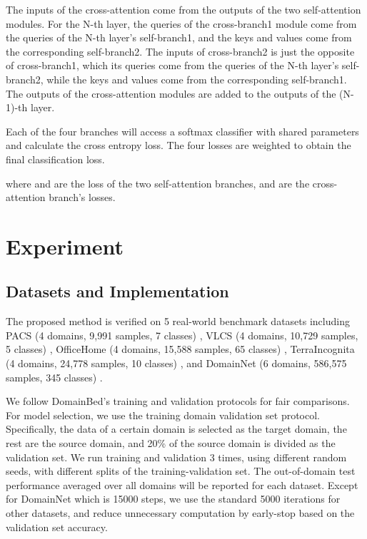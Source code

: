 \documentclass{article}
\begin{document}
The inputs of the cross-attention come from the outputs of the two self-attention modules. For the N-th layer, the queries of the cross-branch1 module come from the queries of the N-th layer's self-branch1, and the keys and values come from the corresponding self-branch2. The inputs of cross-branch2 is just the opposite of cross-branch1, which its queries come from the queries of the N-th layer's self-branch2, while the  keys and values come from the corresponding self-branch1. The outputs of the cross-attention modules are added to the outputs of the (N-1)-th layer.

Each of the four branches will access a softmax classifier with shared parameters and calculate the cross entropy loss. The four losses are weighted to obtain the final classification loss.

where  and  are the loss  of the two self-attention branches,  and  are the cross-attention branch's losses.






\section{Experiment}
\subsection{Datasets and Implementation}
The proposed method is verified  on 5 real-world benchmark datasets including PACS (4 domains, 9,991 samples, 7 classes) \cite{li2017deeper}, VLCS (4 domains, 10,729 samples, 5 classes) \cite{torralba2011unbiased}, OfficeHome (4 domains, 15,588 samples, 65 classes) \cite{venkateswara2017deep}, TerraIncognita (4 domains, 24,778 samples, 10 classes) \cite{beery2018recognition}, and DomainNet (6 domains, 586,575 samples, 345 classes) \cite{peng2019moment}.

We follow DomainBed's \cite{gulrajani2020search} training and validation protocols for fair comparisons. For model selection, we use the training domain validation set protocol. Specifically, the data of a certain domain is selected as the target domain, the rest are the source domain, and 20\% of the source domain is divided as the validation set. We run training and validation 3 times, using different random seeds, with different splits of the training-validation set. The out-of-domain test performance averaged over all domains will be reported for each dataset. Except for DomainNet\cite{peng2019moment} which is 15000 steps, we use the standard 5000 iterations for other datasets, and reduce unnecessary computation by early-stop based on the validation set accuracy.
\end{document}
